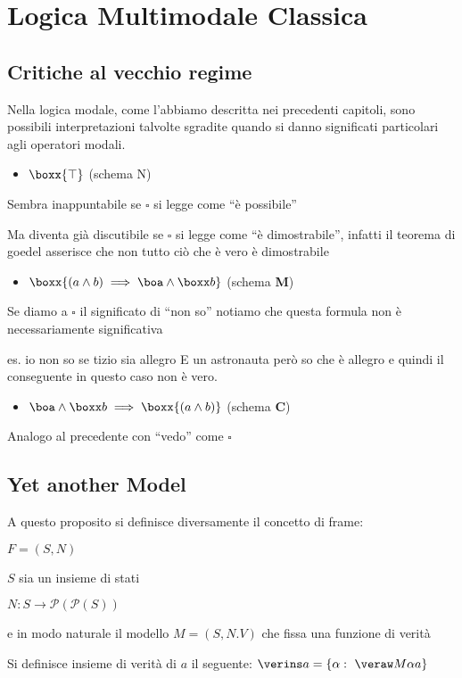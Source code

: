 
\chapter{Logica Multimodale Classica	}


\section{Critiche al vecchio regime}

Nella logica modale, come l'abbiamo descritta nei precedenti capitoli,
sono possibili interpretazioni talvolte sgradite quando si danno significati
particolari agli operatori modali.
\begin{itemize}
\item $\boxx{\top}$ (schema N)
\end{itemize}
Sembra inappuntabile se $\square$ si legge come ``è possibile'' 

Ma diventa già discutibile se $\square$ si legge come ``è dimostrabile'',
infatti il teorema di goedel asserisce che non tutto ciò che è vero
è dimostrabile
\begin{itemize}
\item $\boxx{(a\wedge b)\implies\boa\wedge\boxx b}$ (schema \textbf{M})
\end{itemize}
Se diamo a $\square$ il significato di ``non so'' notiamo che questa
formula non è necessariamente significativa 

es. io non so se tizio sia allegro E un astronauta però so che è allegro
e quindi il conseguente in questo caso non è vero.
\begin{itemize}
\item $\boa\wedge\boxx b\implies\boxx{(a\wedge b)}$ (schema \textbf{C})
\end{itemize}
Analogo al precedente con ``vedo'' come $\square$


\section{Yet another Model}

A questo proposito si definisce diversamente il concetto di frame:

$F=(S,N)$ 

$S$ sia un insieme di stati 

$N:S\rightarrow\mathcal{P}(\mathcal{P}(S))$

e in modo naturale il modello $M=(S,N.V)$ che fissa una funzione
di verità

Si definisce insieme di verità di $a$ il seguente: $\verins a=\{\alpha:\ \veraw M{\alpha}{a\}}$

